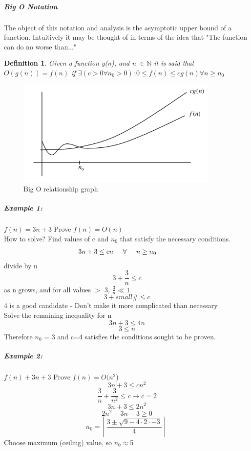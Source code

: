 \documentclass[12pt,letterpaper]{article}
\newtheorem{definition}{Definition}[section]
\begin{document}
\subparagraph*{Big O Notation} 
The object of this notation and analysis is the asymptotic upper bound of a function. Intuitively it may be thought of in terms of the idea that "The function can do no worse than..." \\
\begin{definition}
Given a function g(n), and n $\in \mathbb{N}$ it is said that\\ $ O(g(n))= f(n)$ if $\exists (c>0 \forall n_0 > 0 ) : 0\leq f(n)\leq cg(n) \forall n \geq n_0$\\
\end{definition}
\begin{figure}[h]
\centering
\includegraphics[width=10cm]{bigo}
\caption{Big O relationship graph}
\end{figure}
\pagebreak

\subparagraph*{Example 1:}
$f(n)=3n+3$ Prove $f(n)=O(n)$\\
How to solve? Find values of c and $n_0$ that satisfy the necessary conditions.\\
\[3n+3 \leq cn \hspace{.5cm}\forall \hspace{.5cm} n \geq  n_0 \hspace{1cm}\] divide by n
\[3+ \frac{3}{n} \leq c\]
as n grows, and for all values $>$ 3, $\frac{3}{n} \ll 1$
\[ 3+ small\# \leq c\]
4 is a good candidate - Don't make it more complicated than necessary\\
Solve the remaining inequality for n
\[3n+3\leq4n\]
\[3 \leq n \]
Therefore $n_0$ = 3 and c=4 satisfies the conditions sought to be proven.
 
\subparagraph*{Example 2:}
$f(n)+3n+3$ Prove $f(n)=O(n^2$)
\[3n+3\leq cn^2\]
\[\frac{3}{n}+\frac{3}{n^2} \leq c \to c=2\]
\[3n+3 \leq 2n^2\]
\[2n^2 -3n -3 \geq 0\]
\[n_0 = \left\lceil \frac{3 \pm \sqrt{9-4\cdot 2 \cdot -3}}{4}\right\rceil\  \]
Choose maximum (ceiling) value, so $n_0\approx$5
 
\end{document}
